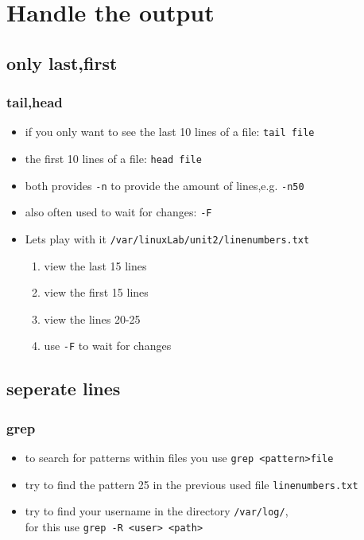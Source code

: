 \documentclass[hyperref={pdfpagelabels=false}]{beamer}
\newcommand{\code}[1]{\colorbox{lGray}{\texttt{#1}}}
\begin{document}
\section{Handle the output}
    \subsection{only last,first}
        \begin{frame}
			\frametitle{tail,head}
			\begin{itemize}
                \item<1-> if you only want to see the last 10 lines of a file: \code{tail file}
                \item<2-> the first 10 lines of a file: \code{head file}
                \item<3-> both provides \code{-n} to provide the amount of lines,e.g. \code{-n50}
                \item<4-> also often used to wait for changes: \code{-F}
                \item<5-> Lets play with it \code{/var/linuxLab/unit2/linenumbers.txt}
                \begin{enumerate}
                    \item<5-> view the last 15 lines
                    \item<6-> view the first 15 lines 
                    \item<7-> view the lines 20-25
                    \item<8-> use \code{-F} to wait for changes
                \end{enumerate}
            \end{itemize}
        \end{frame}
    \subsection{seperate lines}
        \begin{frame}
			\frametitle{grep}
			\begin{itemize}
                \item<1-> to search for patterns within files you use \code{grep \textless pattern\textgreater file}
                \item<2-> try to find the pattern 25 in the previous used file \code{linenumbers.txt}
                \item<3-> try to find your username in the directory \code{/var/log/}, \\
                        for this use \code{grep -R \textless user\textgreater\ \textless path\textgreater *}
            \end{itemize}
        \end{frame}
\end{document}
